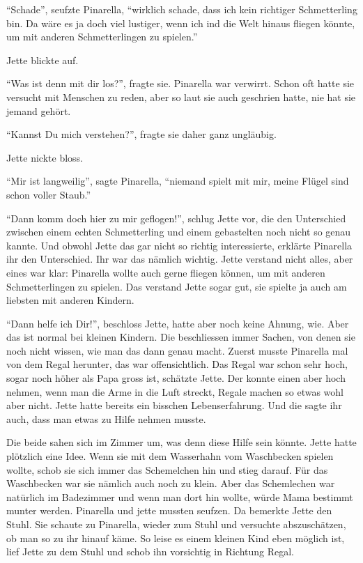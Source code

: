 \enquote{Schade}, seufzte Pinarella, \enquote{wirklich schade, dass ich kein richtiger Schmetterling bin. Da wäre es ja doch viel lustiger, wenn ich ind die Welt hinaus fliegen könnte, um mit anderen Schmetterlingen zu spielen.} 

Jette blickte auf.

\enquote{Was ist denn mit dir los?}, fragte sie. Pinarella war verwirrt. Schon oft hatte sie versucht mit Menschen zu reden, aber so laut sie auch geschrien hatte, nie hat sie jemand gehört.

\enquote{Kannst Du mich verstehen?}, fragte sie daher ganz ungläubig. 

Jette nickte bloss. 

\enquote{Mir ist langweilig}, sagte Pinarella, \enquote{niemand spielt mit mir, meine Flügel sind schon voller Staub.}

\enquote{Dann komm doch hier zu mir geflogen!}, schlug Jette vor, die den Unterschied zwischen einem echten Schmetterling und einem gebastelten noch nicht so genau kannte. Und obwohl Jette das gar nicht so richtig interessierte, erklärte Pinarella ihr den Unterschied. Ihr war das nämlich wichtig. Jette verstand nicht alles, aber eines war klar: Pinarella wollte auch gerne fliegen können, um mit anderen Schmetterlingen zu spielen. Das verstand Jette sogar gut, sie spielte ja auch am liebsten mit anderen Kindern.

\enquote{Dann helfe ich Dir!}, beschloss Jette, hatte aber noch keine Ahnung, wie. Aber das ist normal bei kleinen Kindern. Die beschliessen immer Sachen, von denen sie noch nicht wissen, wie man das dann genau macht. Zuerst musste Pinarella mal von dem Regal herunter, das war offensichtlich. Das Regal war schon sehr hoch, sogar noch höher als Papa gross ist, schätzte Jette. Der konnte einen aber hoch nehmen, wenn man die Arme in die Luft streckt, Regale machen so etwas wohl aber nicht. Jette hatte bereits ein bisschen Lebenserfahrung. Und die sagte ihr auch, dass man etwas zu Hilfe nehmen musste.

Die beide sahen sich im Zimmer um, was denn diese Hilfe sein könnte. Jette hatte plötzlich eine Idee. Wenn sie mit dem Wasserhahn vom Waschbecken spielen wollte, schob sie sich immer das Schemelchen hin und stieg darauf. Für das Waschbecken war sie nämlich auch noch zu klein. Aber das Schemlechen war natürlich im Badezimmer und wenn man dort hin wollte, würde Mama bestimmt munter werden. Pinarella und jette mussten seufzen. Da bemerkte Jette den Stuhl. Sie schaute zu Pinarella, wieder zum Stuhl und versuchte abszuschätzen, ob man so zu ihr hinauf käme. So leise es einem kleinen Kind eben möglich ist, lief Jette zu dem Stuhl und schob ihn vorsichtig in Richtung Regal.

